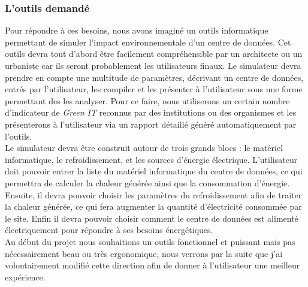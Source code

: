 \subsubsection{L'outils demandé}
Pour répondre à ces besoins, nous avons imaginé un outils informatique permettant de simuler l'impact environnementale d'un centre de données. Cet outils devra tout d'abord être facilement compréhensible par un architecte ou un urbaniste car ils seront probablement les utilisateurs finaux. Le simulateur devra prendre en compte une multitude de paramètres, décrivant un centre de données, entrés par l'utilisateur, les compiler et les présenter à l'utilisateur sous une forme permettant des les analyser. Pour ce faire, nous utiliserons un certain nombre d'indicateur de \emph{Green IT} reconnus par des institutions ou des organismes et les présenterons à l'utilisateur via un rapport détaillé généré automatiquement par l'outils.\\

Le simulateur devra être construit autour de trois grands blocs : le matériel informatique, le refroidissement, et les sources d'énergie électrique. L'utilisateur doit pouvoir entrer la liste du matériel informatique du centre de données, ce qui permettra de calculer la chaleur générée ainsi que la consommation d'énergie. Ensuite, il devra pouvoir choisir les paramètres du refroidissement afin de traiter la chaleur générée, ce qui fera augmenter la quantité d'électricité consommée par le site. Enfin il devra pouvoir choisir comment le centre de données est alimenté électriquement pour répondre à ses besoins énergétiques.\\

Au début du projet nous souhaitions un outils fonctionnel et puissant mais pas nécessairement beau ou très ergonomique, nous verrons par la suite que j'ai volontairement modifié cette direction afin de donner à l'utilisateur une meilleur expérience.